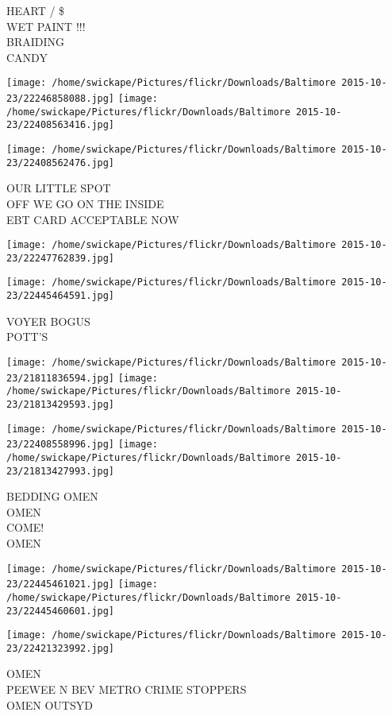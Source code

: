 \documentclass[10pt,letterpaper]{article}
\begin{document}
HEART / \$\\
WET PAINT !!!\\
BRAIDING\\
CANDY
\pagebreak

\texttt{[image: /home/swickape/Pictures/flickr/Downloads/Baltimore 2015-10-23/22246858088.jpg]}
\texttt{[image: /home/swickape/Pictures/flickr/Downloads/Baltimore 2015-10-23/22408563416.jpg]}

\texttt{[image: /home/swickape/Pictures/flickr/Downloads/Baltimore 2015-10-23/22408562476.jpg]}

OUR LITTLE SPOT\\
OFF WE GO ON THE INSIDE\\
EBT CARD ACCEPTABLE NOW
\pagebreak

\texttt{[image: /home/swickape/Pictures/flickr/Downloads/Baltimore 2015-10-23/22247762839.jpg]}

\vspace{0.25in}
\texttt{[image: /home/swickape/Pictures/flickr/Downloads/Baltimore 2015-10-23/22445464591.jpg]}

VOYER BOGUS\\
POTT'S
\pagebreak

\texttt{[image: /home/swickape/Pictures/flickr/Downloads/Baltimore 2015-10-23/21811836594.jpg]}
\texttt{[image: /home/swickape/Pictures/flickr/Downloads/Baltimore 2015-10-23/21813429593.jpg]}

\texttt{[image: /home/swickape/Pictures/flickr/Downloads/Baltimore 2015-10-23/22408558996.jpg]}
\texttt{[image: /home/swickape/Pictures/flickr/Downloads/Baltimore 2015-10-23/21813427993.jpg]}

BEDDING OMEN\\
OMEN\\
COME!\\
OMEN
\pagebreak

\texttt{[image: /home/swickape/Pictures/flickr/Downloads/Baltimore 2015-10-23/22445461021.jpg]}
\texttt{[image: /home/swickape/Pictures/flickr/Downloads/Baltimore 2015-10-23/22445460601.jpg]}

\vspace{0.25in}
\texttt{[image: /home/swickape/Pictures/flickr/Downloads/Baltimore 2015-10-23/22421323992.jpg]}

OMEN\\
PEEWEE N BEV METRO CRIME STOPPERS\\
OMEN OUTSYD
\pagebreak
\end{document}
